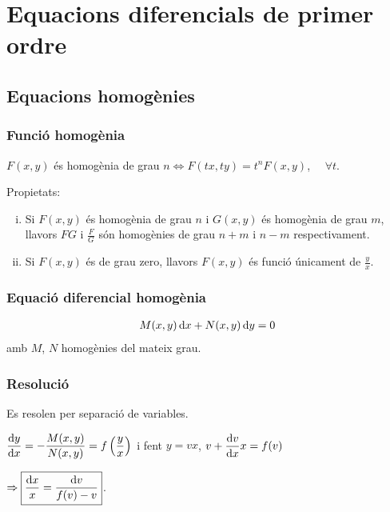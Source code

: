 \section{Equacions diferencials de primer ordre}
\subsection{Equacions homogènies}
\subsubsection*{Funció homogènia}
\begin{defi}
$F(x,y)$ és homogènia de grau $n \Leftrightarrow F(tx, ty) = t^{n} F(x,y)$, $\quad \forall t$.
\end{defi}
Propietats:
\begin{enumerate}[i)]
    \item Si $F(x,y)$ és homogènia de grau $n$ i $G(x,y)$ és homogènia de grau $m$, llavors $FG$ i $\displaystyle \frac{F}{G}$ són homogènies de grau $n+m$ i $n-m$ respectivament.
    \item Si $F(x,y)$ és de grau zero, llavors $F(x,y)$ és funció únicament de $\displaystyle \frac{y}{x}$.
\end{enumerate}

\subsubsection*{Equació diferencial homogènia}
\begin{defi}
\begin{align}
    M(x,y) \mathop{}\!\mathrm{d} x + N(x,y) \mathop{}\!\mathrm{d} y = 0
\end{align}
amb $M$, $N$ homogènies del mateix grau.
\end{defi}

\subsubsection*{Resolució}
Es resolen per separació de variables.
\begin{example}
    $\displaystyle \frac{\mathrm{d} y}{\mathrm{d} x} = - \frac{M(x,y)}{N(x,y)} = f \left( \frac{y}{x} \right)$ i fent $y = vx$, $\displaystyle v + \frac{\mathrm{d} v}{\mathrm{d} x} x = f(v)$

    $\Rightarrow \boxed{\frac{\mathrm{d} x}{x} = \frac{\mathrm{d} v}{f(v) - v}}$.
\end{example}

